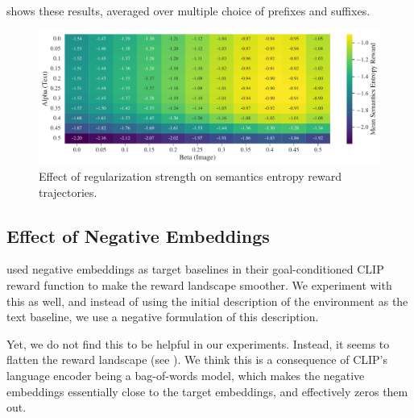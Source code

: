  shows these results, averaged over multiple choice of prefixes and suffixes.

\begin{figure}[H]
    \centering
    \includegraphics[width=\textwidth]{images/alpha_beta_temp12avg_noneg.pdf}
    \caption{Effect of regularization strength on semantics entropy reward trajectories.}
    \label{fig:clip-alpha-beta}
\end{figure}




\subsection{Effect of Negative Embeddings}
\label{sec:negative-embeddings}
\cite{negprompt} used negative embeddings as target baselines in their goal-conditioned CLIP reward function to make the reward landscape smoother.
We experiment with this as well, and instead of using the initial description of the environment as the text baseline, we use a negative formulation of this description.

Yet, we do not find this to be helpful in our experiments.
Instead, it seems to flatten the reward landscape (see \footnotemark[1]).
We think this is a consequence of CLIP's language encoder being a bag-of-words model, which makes the negative embeddings essentially close to the target embeddings, and effectively zeros them out.

